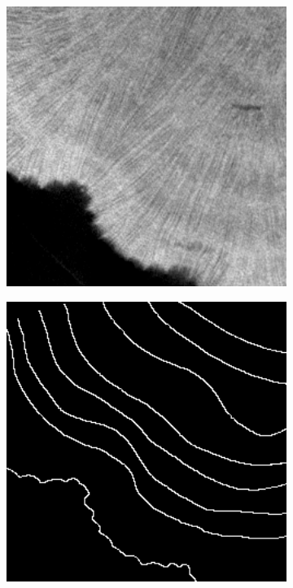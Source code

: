 \begin{figure}[!t]
    \centering
    \begin{subfigure}[t]{0.24\textwidth}
        \centering
        \includegraphics[width=1\textwidth, valign=c]{images/5_image.png}
        \caption{}
    \end{subfigure}
    \begin{subfigure}[t]{0.24\textwidth}
        \centering
        \includegraphics[width=1\textwidth, valign=c]{images/5_label.png}

\end{subfigure}
\end{figure}
